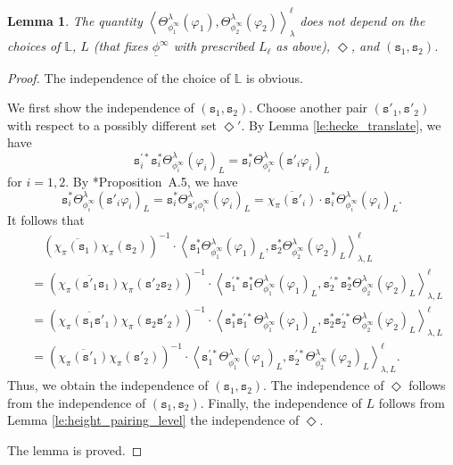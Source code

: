 \documentclass[12pt]{amsart}
\numberwithin{equation}{section}
\theoremstyle{plain}
\newtheorem{lem}[proposition]{Lemma}
\theoremstyle{definition}
\theoremstyle{remark}
\renewcommand{\d}[1]{\mathbb{#1}}
\renewcommand{\(}{\left(}
\renewcommand{\)}{\right)}
\newcommand{\ol}[1]{\overline{#1}{}}
\newcommand{\ul}{\underline}
\newcommand{\dL}{\d L}
\newcommand{\ts}{\mathtt{s}}
\newcommand{\llangle}{\left\langle}
\newcommand{\rrangle}{\right\rangle}
\begin{document}
\begin{lem}
The quantity $\llangle\Theta_{\phi^\infty_1}^\lambda(\varphi_1),\Theta_{\phi^\infty_2}^\lambda(\varphi_2)\rrangle_\lambda^\ell$ does not depend on the choices of $\dL$, $L$ (that fixes $\ul\phi^\infty$ with prescribed $L_\ell$ as above), $\Diamond$, and $(\ts_1,\ts_2)$.
\end{lem}

\begin{proof}
The independence of the choice of $\dL$ is obvious.

We first show the independence of $(\ts_1,\ts_2)$. Choose another pair $(\ts'_1,\ts'_2)$ with respect to a possibly different set $\Diamond'$. By Lemma \ref{le:hecke_translate}, we have
\[
\ts_i^{\prime*}\ts_i^*\Theta_{\phi^\infty_i}^\lambda(\varphi_i)_L=
\ts_i^*\Theta_{\phi^\infty_i}^\lambda(\ts'_i\varphi_i)_L
\]
for $i=1,2$. By \cite{Liu11}*{Proposition~A.5}, we have
\[
\ts_i^*\Theta_{\phi^\infty_i}^\lambda(\ts'_i\varphi_i)_L=\ts_i^*\Theta_{\ts'_i\phi^\infty_i}^\lambda(\varphi_i)_L
=\ol{\chi_\pi(\ts'_i)}\cdot\ts_i^*\Theta_{\phi^\infty_i}^\lambda(\varphi_i)_L.
\]
It follows that
\begin{align*}
&\quad\(\ol{\chi_\pi(\ts_1)}\chi_\pi(\ts_2)\)^{-1}\cdot
\llangle\ts_1^*\Theta_{\phi^\infty_1}^\lambda(\varphi_1)_L,
\ts_2^*\Theta_{\phi^\infty_2}^\lambda(\varphi_2)_L\rrangle_{\lambda,L}^{\ell} \\
&=\(\ol{\chi_\pi(\ts'_1\ts_1)}\chi_\pi(\ts'_2\ts_2)\)^{-1}\cdot
\llangle\ts_1^{\prime*}\ts_1^*\Theta_{\phi^\infty_1}^\lambda(\varphi_1)_L,
\ts_2^{\prime*}\ts_2^*\Theta_{\phi^\infty_2}^\lambda(\varphi_2)_L\rrangle_{\lambda,L}^{\ell} \\
&=\(\ol{\chi_\pi(\ts_1\ts'_1)}\chi_\pi(\ts_2\ts'_2)\)^{-1}\cdot
\llangle\ts_1^*\ts_1^{\prime*}\Theta_{\phi^\infty_1}^\lambda(\varphi_1)_L,
\ts_2^*\ts_2^{\prime*}\Theta_{\phi^\infty_2}^\lambda(\varphi_2)_L\rrangle_{\lambda,L}^{\ell} \\
&=\(\ol{\chi_\pi(\ts'_1)}\chi_\pi(\ts'_2)\)^{-1}\cdot
\llangle\ts_1^{\prime*}\Theta_{\phi^\infty_1}^\lambda(\varphi_1)_L,
\ts_2^{\prime*}\Theta_{\phi^\infty_2}^\lambda(\varphi_2)_L\rrangle_{\lambda,L}^{\ell}.
\end{align*}
Thus, we obtain the independence of $(\ts_1,\ts_2)$. The independence of $\Diamond$ follows from the independence of $(\ts_1,\ts_2)$. Finally, the independence of $L$ follows from Lemma \ref{le:height_pairing_level} the independence of $\Diamond$.

The lemma is proved.
\end{proof}
\end{document}
